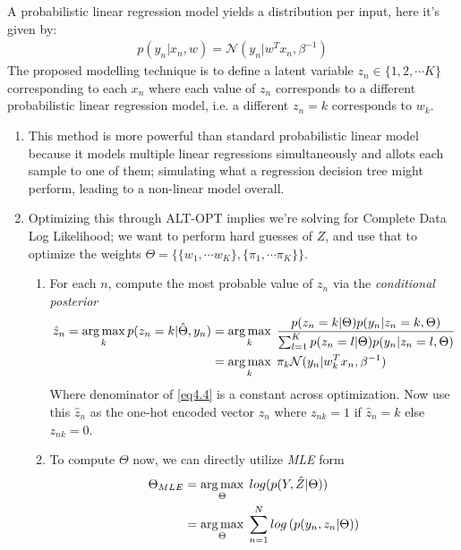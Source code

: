 \documentclass[a4paper,11pt]{article}
\begin{document}
\begin{mlsolution}

A probabilistic linear regression model yields a distribution per input, here it's given by:
\begin{align*}
    p(y_n \vert x_n, w) = \mathcal{N}(y_n \vert w^T x_n, \beta^{-1})
\end{align*}
The proposed modelling technique is to define a latent variable $z_n \in \{1, 2, \cdots K\}$ corresponding to each $x_n$ where each value of $z_n$ corresponds to a different probabilistic linear regression model, i.e. a different $z_n = k$ corresponds to $w_k$.

\begin{enumerate}
    \item This method is more powerful than standard probabilistic linear model because it models multiple linear regressions simultaneously and allots each sample to one of them; simulating what a regression decision tree might perform, leading to a non-linear model overall.
\item 
    Optimizing this through ALT-OPT implies we're solving for Complete Data Log Likelihood; we want to perform hard guesses of $Z$, and use that to optimize the weights $\Theta = \{ \{ w_1, \cdots w_K \}, \{ \pi_1, \cdots \pi_K \} \}$.
    \begin{enumerate}
        \item For each $n$, compute the most probable value of $z_n$ via the \textit{conditional posterior}
        \begin{align}
            \hat{z}_n = \mathop{\arg\max}_k p(z_n = k \vert \hat{\Theta}, y_n) &= \mathop{\arg\max}_k\; \frac{p(z_n = k \vert \Theta) p(y_n \vert z_n = k, \Theta)}{\sum_{l=1}^{K}p(z_n = l \vert \Theta) p(y_n \vert z_n = l, \Theta)}\label{eq4.4} \\
            &= \mathop{\arg\max}_k\; \pi_k \mathcal{N}(y_n \vert w_k^T x_n, \beta^{-1}) \label{eq4.5}
        \end{align}
        Where denominator of \ref{eq4.4} is a constant across optimization. Now use this $\hat{z}_{n}$ as the one-hot encoded vector $z_n$ where $z_{nk} = 1$ if $\hat{z}_{n} = k$ else $z_{nk} = 0$.
        \item To compute $\Theta$ now, we can directly utilize \textit{MLE} form
        \begin{align*}
            \Theta_{MLE} &= \argmax_\Theta\; log(p(Y, \hat{Z} \vert \Theta)) \\
            &= \argmax_\Theta\; \sum_{n=1}^{N} log\left( p(y_n, z_n \vert \Theta) \right)

\end{align*}
\end{enumerate}
\end{enumerate}
\end{mlsolution}
\end{document}
